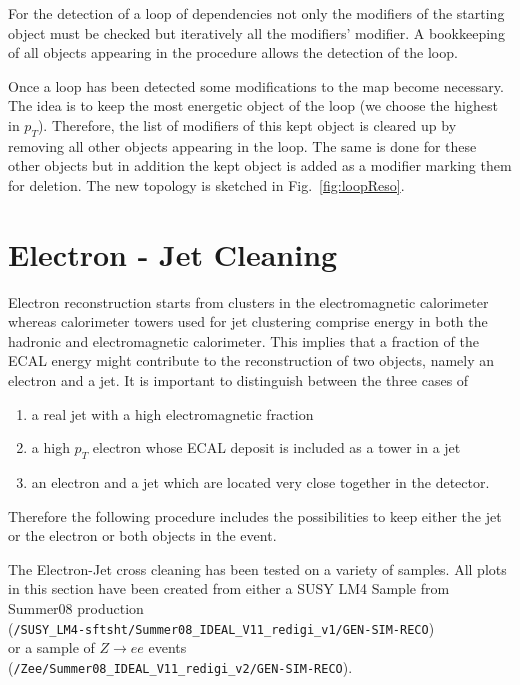 \documentclass{cmspaper}
\begin{document}
For the detection of a loop of dependencies not only the modifiers of the
starting object must be checked but iteratively all the modifiers' modifier. A
bookkeeping of all objects appearing in the procedure allows the detection of
the loop.

Once a loop has been detected some modifications to the map become necessary.
The idea is to keep the most energetic object of the loop (we choose the
highest in $p_T$). Therefore, the list of modifiers of this kept object is
cleared up by removing all other objects appearing in the loop.  The same is
done for these other objects but in addition the kept object is added as a
modifier marking them for deletion. The new topology is sketched in
Fig.~\ref{fig:loopReso}.


\section{Electron - Jet Cleaning}
\label{sec:ElecJet}
Electron reconstruction starts from clusters in the electromagnetic calorimeter
whereas calorimeter towers used for jet clustering comprise energy in both the
hadronic and electromagnetic calorimeter. This implies that a fraction of the
ECAL energy might contribute to the reconstruction of two objects, namely an
electron and a jet. It is important to distinguish between the three cases of
\begin{enumerate}
\item a real jet with a high electromagnetic fraction
\item a high $p_T$ electron whose ECAL deposit is included as a tower in a jet
\item an electron and a jet which are located very close together in the
    detector.
\end{enumerate}
Therefore the following procedure includes the possibilities to keep either the
jet or the electron or both objects in the event.

The Electron-Jet cross cleaning has been tested on a variety of samples. All
plots in this section have been created from either a SUSY LM4 Sample from
Summer08 production\\
(\texttt{/SUSY\_LM4-sftsht/Summer08\_IDEAL\_V11\_redigi\_v1/GEN-SIM-RECO})\\
or a sample of
$Z\rightarrow ee$ events \\(\texttt{/Zee/Summer08\_IDEAL\_V11\_redigi\_v2/GEN-SIM-RECO}).
\end{document}
